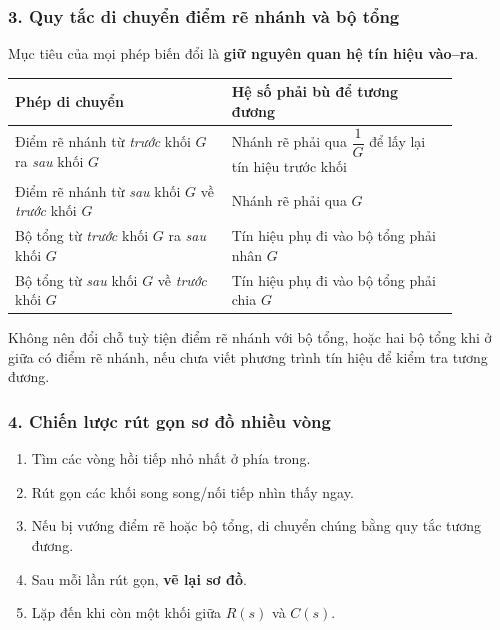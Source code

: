 \subsubsection*{3. Quy tắc di chuyển điểm rẽ nhánh và bộ tổng}

Mục tiêu của mọi phép biến đổi là \textbf{giữ nguyên quan hệ tín hiệu vào--ra}.

\begin{center}
\begin{tabular}{|p{0.43\linewidth}|p{0.45\linewidth}|}
\hline
\textbf{Phép di chuyển} & \textbf{Hệ số phải bù để tương đương} \\ \hline
Điểm rẽ nhánh từ \emph{trước} khối $G$ ra \emph{sau} khối $G$ &
Nhánh rẽ phải qua $\dfrac{1}{G}$ để lấy lại tín hiệu trước khối \\ \hline
Điểm rẽ nhánh từ \emph{sau} khối $G$ về \emph{trước} khối $G$ &
Nhánh rẽ phải qua $G$ \\ \hline
Bộ tổng từ \emph{trước} khối $G$ ra \emph{sau} khối $G$ &
Tín hiệu phụ đi vào bộ tổng phải nhân $G$ \\ \hline
Bộ tổng từ \emph{sau} khối $G$ về \emph{trước} khối $G$ &
Tín hiệu phụ đi vào bộ tổng phải chia $G$ \\ \hline
\end{tabular}
\end{center}

Không nên đổi chỗ tuỳ tiện điểm rẽ nhánh với bộ tổng, hoặc hai bộ tổng khi ở giữa
có điểm rẽ nhánh, nếu chưa viết phương trình tín hiệu để kiểm tra tương đương.

\subsubsection*{4. Chiến lược rút gọn sơ đồ nhiều vòng}

\begin{enumerate}
  \item Tìm các vòng hồi tiếp nhỏ nhất ở phía trong.
  \item Rút gọn các khối song song/nối tiếp nhìn thấy ngay.
  \item Nếu bị vướng điểm rẽ hoặc bộ tổng, di chuyển chúng bằng quy tắc tương đương.
  \item Sau mỗi lần rút gọn, \textbf{vẽ lại sơ đồ}.
  \item Lặp đến khi còn một khối giữa $R(s)$ và $C(s)$.
\end{enumerate}

\medskip
\noindent
{}

